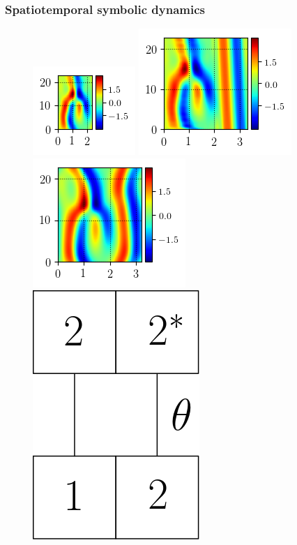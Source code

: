 \documentclass[mathserif, handout]{beamer}
\begin{document}
\begin{frame}%
  \frametitle{Spatiotemporal symbolic dynamics}
\begin{figure}
\includegraphics[width=.25\textwidth,height=.25\textheight]{MNG_HD_init}
\includegraphics[width=.25\textwidth,height=.25\textheight]{MNG_HD_STREAK_init}
\includegraphics[width=.25\textwidth,height=.25\textheight]{MNG_HD_STREAK_final}
\includegraphics[width=.25\textwidth,height=.25\textheight]{MNG_symb1222rot}
\end{figure}
\end{frame}
\end{document}
